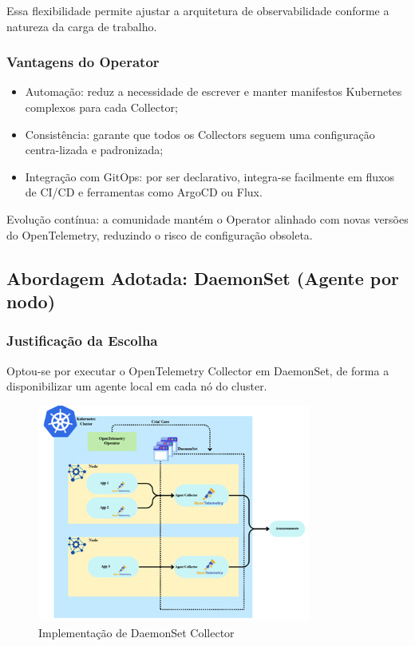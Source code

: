 Essa flexibilidade permite ajustar a arquitetura de observabilidade conforme a natureza da carga de trabalho.

\subsubsection{Vantagens do Operator}

\begin{itemize}
    \item Automação: reduz a necessidade de escrever e manter manifestos Kubernetes complexos para cada Collector;
    \item Consistência: garante que todos os Collectors seguem uma configuração centra-lizada e padronizada;
    \item Integração com GitOps: por ser declarativo, integra-se facilmente em fluxos de CI/CD e ferramentas como ArgoCD ou Flux.
\end{itemize}

Evolução contínua: a comunidade mantém o Operator alinhado com novas versões do OpenTelemetry, reduzindo o risco de configuração obsoleta.

\subsection{Abordagem Adotada: DaemonSet (Agente por nodo)}

\subsubsection{Justificação da Escolha}

Optou-se por executar o OpenTelemetry Collector em DaemonSet, de forma a disponibilizar um agente local em cada nó do cluster. 

\begin{figure}[h]
    \centering
    \includegraphics[width=0.8\textwidth]{images/Diagramas/daemonset collector.png}
    \caption{Implementação de DaemonSet Collector}
\end{figure}

